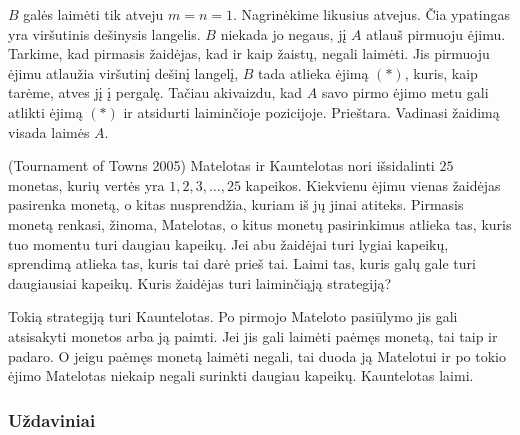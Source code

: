 \begin{sprendimas}
  $B$ galės laimėti tik atveju $m=n=1$. Nagrinėkime likusius atvejus. Čia
  ypatingas yra viršutinis dešinysis langelis. $B$ niekada jo negaus, jį $A$
  atlauš pirmuoju ėjimu. Tarkime, kad pirmasis žaidėjas, kad ir kaip žaistų,
  negali laimėti. Jis pirmuoju ėjimu atlaužia viršutinį dešinį langelį, $B$
  tada atlieka ėjimą $(*)$, kuris, kaip tarėme, atves jį į pergalę. Tačiau
  akivaizdu, kad $A$ savo pirmo ėjimo metu gali atlikti ėjimą $(*)$ ir
  atsidurti laiminčioje pozicijoje. Prieštara. Vadinasi žaidimą visada laimės
  $A$. 
\end{sprendimas}

\begin{pavnr}{(Tournament of Towns 2005)}
  Matelotas ir Kauntelotas nori išsidalinti $25$ monetas, kurių vertės yra $1, 2, 3, \dots
  , 25$ kapeikos. Kiekvienu ėjimu vienas žaidėjas pasirenka monetą, o kitas
  nusprendžia, kuriam iš jų jinai atiteks. Pirmasis monetą renkasi, žinoma,
  Matelotas, o kitus monetų pasirinkimus atlieka tas, kuris tuo momentu turi
  daugiau kapeikų. Jei abu žaidėjai turi lygiai kapeikų, sprendimą atlieka
  tas, kuris tai darė prieš tai. Laimi tas, kuris galų gale turi
  daugiausiai kapeikų.  Kuris žaidėjas turi laiminčiąją strategiją?
\end{pavnr}

\begin{sprendimas}
  Tokią strategiją turi Kauntelotas. Po pirmojo Mateloto pasiūlymo jis gali atsisakyti
  monetos arba ją paimti. Jei jis gali laimėti paėmęs monetą, tai taip ir
  padaro. O jeigu paėmęs monetą laimėti negali, tai duoda ją Matelotui ir po
  tokio ėjimo Matelotas niekaip negali surinkti daugiau kapeikų. Kauntelotas laimi.
\end{sprendimas}

\subsubsection{Uždaviniai}


